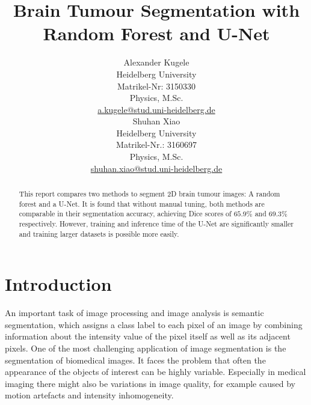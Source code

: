 \documentclass[final]{article}
\title{Brain Tumour Segmentation with Random Forest and U-Net}
\author{
  Alexander Kugele \\
  Heidelberg University \\
  Matrikel-Nr: 3150330\\
  Physics, M.Sc. \\
  \href{mailto:a.kugele@stud.uni-heidelberg.de}{a.kugele@stud.uni-heidelberg.de}\\
  \And
  Shuhan Xiao \\
  Heidelberg University \\
  Matrikel-Nr.: 3160697 \\
  Physics, M.Sc. \\
  \href{mailto:shuhan.xiao@stud.uni-heidelberg.de}{shuhan.xiao@stud.uni-heidelberg.de}\\
}
\begin{document}
\maketitle

\begin{abstract}
This report compares two methods to segment 2D brain tumour images: A random
forest and a U-Net. It is found that without manual tuning, both methods are
comparable in their segmentation accuracy, achieving Dice scores of $65.9 \%$
and $69.3 \%$ respectively. However, training and inference time of the U-Net
are significantly smaller and training larger datasets is possible more easily.
\end{abstract}

\section{Introduction}
An important task of image processing and image analysis is semantic segmentation, which assigns a class label to each pixel of an image by combining information about the intensity value of the pixel itself as well as its adjacent pixels. One of the most challenging application of image segmentation is the segmentation of biomedical images. It faces the problem that often the appearance of the objects of interest can be highly variable. Especially in medical imaging there might also be variations in image quality, for example caused by motion artefacts and intensity inhomogeneity. \\
\end{document}
